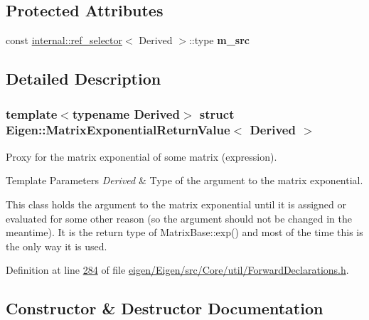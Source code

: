 \subsection*{Protected Attributes}
\begin{DoxyCompactItemize}
\item 
\mbox{\label{struct_eigen_1_1_matrix_exponential_return_value_ab455a6500bee3b3457942e4f7d30d216}} 
const \hyperlink{struct_eigen_1_1internal_1_1ref__selector}{internal\+::ref\+\_\+selector}$<$ Derived $>$\+::type {\bfseries m\+\_\+src}
\end{DoxyCompactItemize}


\subsection{Detailed Description}
\subsubsection*{template$<$typename Derived$>$\newline
struct Eigen\+::\+Matrix\+Exponential\+Return\+Value$<$ Derived $>$}

Proxy for the matrix exponential of some matrix (expression). 


\begin{DoxyTemplParams}{Template Parameters}
{\em Derived} & Type of the argument to the matrix exponential.\\
\hline
\end{DoxyTemplParams}
This class holds the argument to the matrix exponential until it is assigned or evaluated for some other reason (so the argument should not be changed in the meantime). It is the return type of Matrix\+Base\+::exp() and most of the time this is the only way it is used. 

Definition at line \hyperlink{eigen_2_eigen_2src_2_core_2util_2_forward_declarations_8h_source_l00284}{284} of file \hyperlink{eigen_2_eigen_2src_2_core_2util_2_forward_declarations_8h_source}{eigen/\+Eigen/src/\+Core/util/\+Forward\+Declarations.\+h}.



\subsection{Constructor \& Destructor Documentation}
\mbox{\label{struct_eigen_1_1_matrix_exponential_return_value_a4048419b1ee2befc51564703ba11acab}} 
